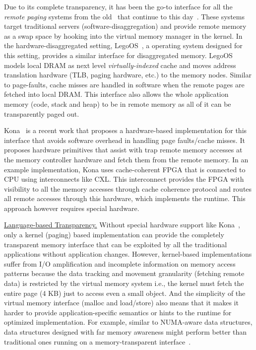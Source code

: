 Due to its complete transparency, it has been the 
go-to interface for all the \textit{remote paging} systems 
from the old~\cite{gms,cashmere} that continue to this
day~\cite{infiniswap,fastswap,zswap,leap}.
These systems target traditional servers 
(software-disaggregation) and provide remote memory as a swap 
space by hooking into the virtual memory manager in the kernel.
In the hardware-disaggregated setting, LegoOS~\cite{legoos}, a 
operating system designed for this setting, provides a similar 
interface for disaggregated memory. LegoOS models local DRAM as
next level \textit{virtually-indexed} cache and moves address 
translation hardware (TLB, paging hardware, etc.) to the memory
nodes. Similar to page-faults, cache misses are handled in 
software when the remote pages are fetched into local DRAM.
This interface also allows the whole application memory 
(code, stack and heap) to be in remote memory as all of it 
can be transparently paged out.

Kona~\cite{kona} is a recent work that proposes a hardware-based 
implementation for this interface that avoids software overhead in
handling page faults/cache misses. It proposes hardware primitives 
that assist with trap remote memory accesses at the memory controller 
hardware and fetch them from the remote memory. In an example 
implementation, Kona uses cache-coherent FPGA that is connected to 
CPU using interconnects like CXL\cite{ccix}. This 
interconnect provides the FPGA with visibility to all the memory 
accesses through cache coherence protocol and routes all remote 
accesses through this hardware, which implements the runtime. 
This approach however requires special hardware.

\vspace{3pt}
\noindent \uline{Language-based Transparency.}
Without special hardware support like Kona~\cite{kona}, 
only a kernel (paging) based implementation can provide 
the completely transparent memory interface that can be 
exploited by all the traditional applications
without application changes. However, kernel-based 
implementations suffer from I/O amplification and 
incomplete information on memory access 
patterns because the data tracking and movement granularity 
(fetching remote data) is restricted by the virtual memory 
system i.e., the kernel must fetch the entire page (4 KB) 
just to access even a small object. And the simplicity  
of the virtual memory interface 
(malloc and load/store) also means that it makes it 
harder to provide application-specific semantics or 
hints to the runtime for optimized implementation. 
For example, similar to NUMA-aware data 
structures, data structures designed with far memory 
awareness might perform better than traditional ones 
running on a memory-transparent interface~\cite{Aguilera2019}. 

